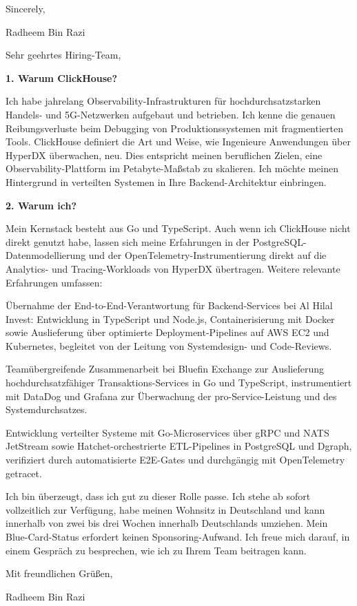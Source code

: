 \documentclass[11pt,a4paper]{coverletter}
\begin{document}
\closing{Sincerely,}{Radheem Bin Razi}

\clearpage
{}


\opening{Sehr geehrtes Hiring-Team,}

\vspace{8pt}\noindent\textbf{1. Warum ClickHouse?}\par\vspace{3pt}

Ich habe jahrelang Observability-Infrastrukturen für hochdurchsatzstarken Handels- und 5G-Netzwerken aufgebaut und betrieben. Ich kenne die genauen Reibungsverluste beim Debugging von Produktionssystemen mit fragmentierten Tools. ClickHouse definiert die Art und Weise, wie Ingenieure Anwendungen über HyperDX überwachen, neu. Dies entspricht meinen beruflichen Zielen, eine Observability-Plattform im Petabyte-Maßstab zu skalieren. Ich möchte meinen Hintergrund in verteilten Systemen in Ihre Backend-Architektur einbringen.

\vspace{8pt}\noindent\textbf{2. Warum ich?}\par\vspace{3pt}

Mein Kernstack besteht aus Go und TypeScript. Auch wenn ich ClickHouse nicht direkt genutzt habe, lassen sich meine Erfahrungen in der PostgreSQL-Datenmodellierung und der OpenTelemetry-Instrumentierung direkt auf die Analytics- und Tracing-Workloads von HyperDX übertragen. Weitere relevante Erfahrungen umfassen:

\bullets

  \item Übernahme der End-to-End-Verantwortung für Backend-Services bei Al Hilal Invest: Entwicklung in TypeScript und Node.js, Containerisierung mit Docker sowie Auslieferung über optimierte Deployment-Pipelines auf AWS EC2 und Kubernetes, begleitet von der Leitung von Systemdesign- und Code-Reviews.

  \item Teamübergreifende Zusammenarbeit bei Bluefin Exchange zur Auslieferung hochdurchsatzfähiger Transaktions-Services in Go und TypeScript, instrumentiert mit DataDog und Grafana zur Überwachung der pro-Service-Leistung und des Systemdurchsatzes.

  \item Entwicklung verteilter Systeme mit Go-Microservices über gRPC und NATS JetStream sowie Hatchet-orchestrierte ETL-Pipelines in PostgreSQL und Dgraph, verifiziert durch automatisierte E2E-Gates und durchgängig mit OpenTelemetry getracet.

\bulletsend

Ich bin überzeugt, dass ich gut zu dieser Rolle passe. Ich stehe ab sofort vollzeitlich zur Verfügung, habe meinen Wohnsitz in Deutschland und kann innerhalb von zwei bis drei Wochen innerhalb Deutschlands umziehen. Mein Blue-Card-Status erfordert keinen Sponsoring-Aufwand. Ich freue mich darauf, in einem Gespräch zu besprechen, wie ich zu Ihrem Team beitragen kann.

\closing{Mit freundlichen Grüßen,}{Radheem Bin Razi}
\end{document}
